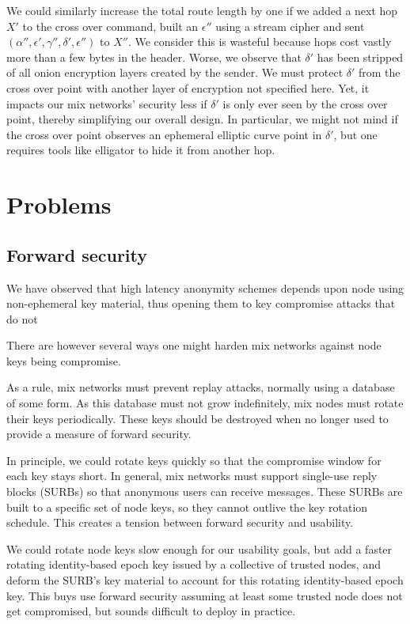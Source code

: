 \documentclass[twoside,letterpaper]{llncs}
\begin{document}
We could similarly increase the total route length by one if
we added a next hop $X'$ to the cross over command, built an
$\epsilon''$ using a stream cipher and sent
 $(\alpha'',\epsilon',\gamma'',\delta',\epsilon'')$ to $X''$.
We consider this is wasteful because hops cost vastly more than
a few bytes in the header.  Worse, we observe that $\delta'$ has
been stripped of all onion encryption layers created by the sender.
We must protect $\delta'$ from the cross over point with another
layer of encryption not specified here.  Yet, it impacts our mix
networks' security less if $\delta'$ is only ever seen by the cross
over point, thereby simplifying our overall design.  In particular,
we might not mind if the cross over point observes an ephemeral
elliptic curve point in $\delta'$, but one requires tools like
elligator \cite{elligator,elligator2} to hide it from another hop.


\section{Problems} %

\subsection{Forward security}

We have observed that high latency anonymity schemes depends upon
node using non-ephemeral key material, thus opening them to key
compromise attacks that do not

There are however several ways one might harden mix networks against node
keys being compromise. 

As a rule, mix networks must prevent replay attacks, normally using
a database of some form.  As this database must not grow indefinitely,
mix nodes must rotate their keys periodically.  These keys should be
destroyed when no longer used to provide a measure of forward security.

In principle, we could rotate keys quickly so that the compromise
window for each key stays short.  In general, mix networks must
support single-use reply blocks (SURBs) so that anonymous users can
receive messages.  These SURBs are built to a specific set of node
keys, so they cannot outlive the key rotation schedule.  This creates
a tension between forward security and usability.

We could rotate node keys slow enough for our usability goals, but add
a faster rotating identity-based epoch key issued by a collective of
trusted nodes, and deform the SURB's key material to account for this
rotating identity-based epoch key.  This buys use forward security
assuming at least some trusted node does not get compromised, but
sounds difficult to deploy in practice. 
\end{document}
